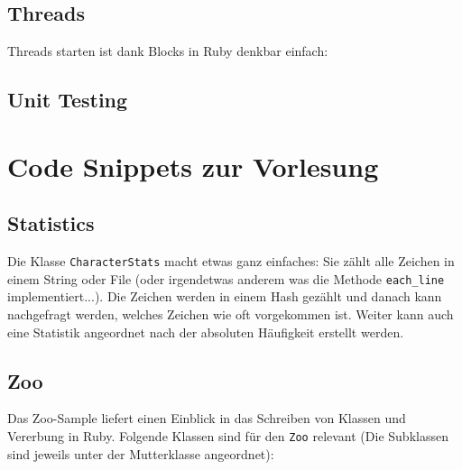 \documentclass[a4book,11pt,twoside]{scrbook}
\begin{document}




\section{Threads} %
\label{sec:threads}
Threads starten ist dank Blocks in Ruby denkbar einfach:




\section{Unit Testing} %
\label{sec:unit_testing}











\chapter{Code Snippets zur Vorlesung}


\section{Statistics} %
\label{sec:statistics}
Die Klasse \texttt{CharacterStats} macht etwas ganz einfaches: Sie zählt alle Zeichen in einem String oder File (oder irgendetwas anderem was die Methode \texttt{each\_line} implementiert...).
Die Zeichen werden in einem Hash gezählt und danach kann nachgefragt werden, welches Zeichen wie oft vorgekommen ist. Weiter kann auch eine Statistik angeordnet nach der absoluten Häufigkeit erstellt werden.


\section{Zoo} %
\label{sec:zoo}
Das Zoo-Sample liefert einen Einblick in das Schreiben von Klassen und Vererbung in Ruby. Folgende Klassen sind für den \texttt{Zoo} relevant (Die Subklassen sind jeweils unter der Mutterklasse angeordnet):
\end{document}
